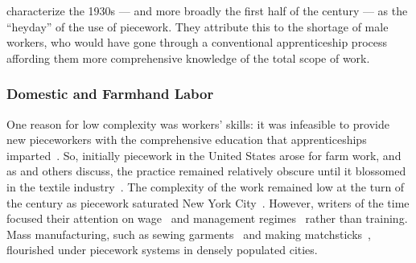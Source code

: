 \documentclass[trackingWork]{subfiles}
\begin{document}

\citeauthor{hart2013rise} characterize the 1930s
--- and more broadly the first half of the  century ---
as the ``heyday'' of the use of piecework.
They attribute this to the shortage of male workers,
who would have gone through a conventional apprenticeship process
affording them more comprehensive knowledge of the total scope of work.





\onlyinsubfile{\clearpage}
\subsubsection{Domestic and Farmhand Labor}
One reason for low complexity was workers' skills:
it was infeasible to provide new pieceworkers with the comprehensive education
that apprenticeships imparted~\cite{hart2013rise}.
So, initially piecework in the United States arose for farm work, and as
\citeauthor{hughRaynbirdTaskWork} and others discuss,
the practice remained relatively obscure until
it blossomed in the textile industry~\cite{hughRaynbirdTaskWork}.
The complexity of the work remained low at the turn of
the  century as piecework saturated New York City~\cite{riisOtherSideLives}.
However, writers of the time focused their attention on
wage~\cite{burton1899commercial} and
management regimes~\cite{norton1900textile}
rather than training.
Mass manufacturing,
such as sewing garments~\cite{riisOtherSideLives} and making matchsticks~\cite{10.2307/3827491},
flourished under piecework systems in densely populated cities.
\end{document}
